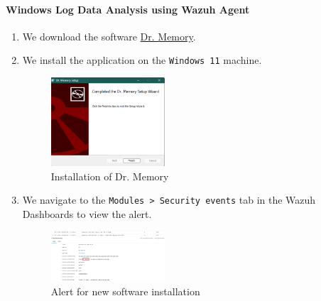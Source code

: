 \paragraph{Windows Log Data Analysis using Wazuh Agent}
\begin{enumerate}
    \item We download the software \href{https://drmemory.org}{Dr. Memory}.
    \item We install the application on the \texttt{Windows 11} machine.
    \begin{figure} [H]
    \centering
    \includegraphics[width=0.4\textwidth]{images/log-data/11.png}
    \caption{Installation of Dr. Memory}
    \end{figure}
    \item We navigate to the \texttt{Modules > Security events} tab in the Wazuh Dashboards to view the alert. 
    \begin{figure} [H]
    \centering
    \includegraphics[width=0.4\textwidth]{images/log-data/12.png}
    \caption{Alert for new software installation}
    \end{figure}
\end{enumerate}
